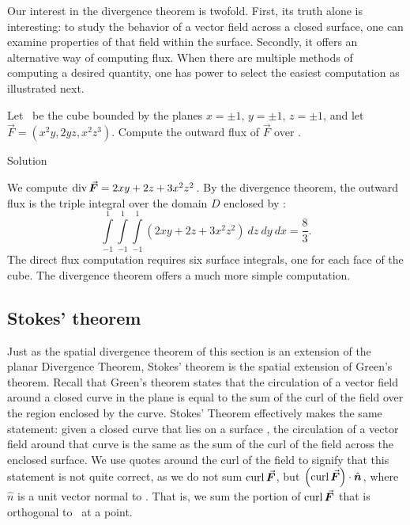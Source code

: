 Our interest in the divergence theorem is twofold. First, its truth alone is interesting: to study the behavior of a vector field across a closed surface, one can examine properties of that field within the surface. Secondly, it offers an alternative way of computing flux. When there are multiple methods of computing a desired quantity, one has power to select the easiest computation as illustrated next.\\

\begin{example}
\label{ex_divthm_space4}
Let \surfaceS\ be the cube bounded by the planes $x=\pm 1$, $y=\pm 1$, $z=\pm 1$, and let $\vec F = \left( x^2y,2yz,x^2z^3\right)$. Compute the outward flux of $\vec F$ over \surfaceS.

Solution 

We compute $\divv \vec F = 2xy+2z+3x^2z^2$. By the divergence theorem, the outward flux is the triple integral over the domain $D$ enclosed by \surfaceS:
$$ \int\limits_{-1}^1\int\limits_{-1}^1\int\limits_{-1}^1(2xy+2z+3x^2z^2)\ dz\ dy\ dx = \frac83.$$
The direct flux computation requires six surface integrals, one for each face of the cube. The divergence theorem offers a much more simple computation.
\end{example}


\subsection{Stokes' theorem}

	\checkoddpage
{}
Just as the spatial divergence theorem of this section is an extension of the planar Divergence Theorem, Stokes' theorem is the spatial extension of Green's theorem. Recall that Green's theorem states that the circulation of a vector field around a closed curve in the plane is equal to the sum of the curl of the field over the region enclosed by the curve. Stokes' Theorem effectively makes the same statement: given a closed curve that lies on a surface \surfaceS, the circulation of a vector field around that curve is the same as the sum of the curl of the field across the enclosed surface. We use quotes around the curl of the field to signify that this statement is not quite correct, as we do not sum $\curl \vec F$, but $\left(\curl \vec F\right)\cdot\hat n$, where $\hat n$ is a unit vector normal to \surfaceS. That is, we sum the portion of $\curl \vec F$ that is orthogonal to \surfaceS\ at a point.

